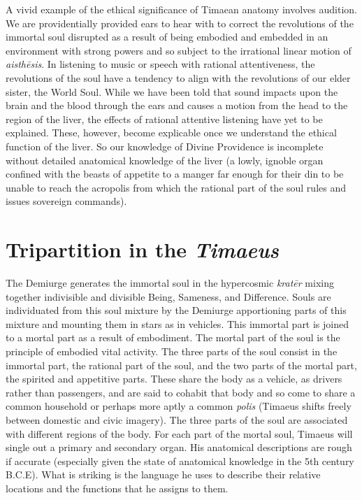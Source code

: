 A vivid example of the ethical significance of Timaean anatomy involves audition. We are providentially provided ears to hear with to correct the revolutions of the immortal soul disrupted as a result of being embodied and embedded in an environment with strong powers and so subject to the irrational linear motion of \emph{aisthēsis}. In listening to music or speech with rational attentiveness, the revolutions of the soul have a tendency to align with the revolutions of our elder sister, the World Soul. While we have been told that sound impacts upon the brain and the blood through the ears and causes a motion from the head to the region of the liver, the effects of rational attentive listening have yet to be explained. These, however, become explicable once we understand the ethical function of the liver. So our knowledge of Divine Providence is incomplete without detailed anatomical knowledge of the liver (a lowly, ignoble organ confined with the beasts of appetite to a manger far enough for their din to be unable to reach the acropolis from which the rational part of the soul rules and issues sovereign commands).


\section{Tripartition in the \emph{Timaeus}} %
\label{sec:tripartition_in_the_emph_timaeus}

The Demiurge generates the immortal soul in the hypercosmic \emph{kratēr} mixing together indivisible and divisible Being, Sameness, and Difference. Souls are individuated from this soul mixture by the Demiurge apportioning parts of this mixture and mounting them in stars as in vehicles. This immortal part is joined to a mortal part as a result of embodiment. The mortal part of the soul is the principle of embodied vital activity. The three parts of the soul consist in the immortal part, the rational part of the soul, and the two parts of the mortal part, the spirited and appetitive parts. These share the body as a vehicle, as drivers rather than passengers, and are said to cohabit that body and so come to share a common household or perhaps more aptly a common \emph{polis} (Timaeus shifts freely between domestic and civic imagery). The three parts of the soul are associated with different regions of the body. For each part of the mortal soul, Timaeus will single out a primary and secondary organ. His anatomical descriptions are rough if accurate (especially given the state of anatomical knowledge in the 5th century B.C.E). What is striking is the language he uses to describe their relative locations and the functions that he assigns to them. 

